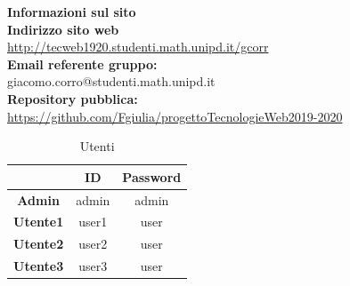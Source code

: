 \begin{center}
	\textbf{\Large{Informazioni sul sito}}\\
	\textbf{Indirizzo sito web} \\ \url{http://tecweb1920.studenti.math.unipd.it/gcorr}\\
	\textbf{Email referente gruppo:} \\ giacomo.corro@studenti.math.unipd.it \\
	\textbf{Repository pubblica:} \\ \url{https://github.com/Fgiulia/progettoTecnologieWeb2019-2020}\\
	\renewcommand{\arraystretch}{1.8}
	\begin{longtable}[H]{c c c}
		\caption{Utenti}\\
		\rowcolor[HTML]{58c25d}
		\multicolumn{1}{c}{\color[HTML]{FFFFFF} \textbf{Utente}} &
		\multicolumn{1}{c}{\color[HTML]{FFFFFF} \textbf{ID}} &
		\multicolumn{1}{c}{\color[HTML]{FFFFFF} \textbf{Password}} \\
		\endhead
		\textbf{Admin} & admin & admin\\
		\textbf{Utente1} & user1 & user\\
		\textbf{Utente2} & user2 & user\\
		\textbf{Utente3} & user3 & user\\
	\end{longtable}
\end{center}